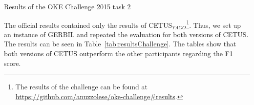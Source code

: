 \begin{table}[htb!]
\centering{}
\caption{Results of the OKE Challenge 2015 task 2}
\label{tab:resultsChallenge}
\centering
{}
\caption{Results for the different sub tasks of task 2}
\label{tab:resultsSubTasks}
\end{table}

The official results contained only the results of CETUS$_{YAGO}$\footnote{The results of the challenge can be found at \url{https://github.com/anuzzolese/oke-challenge\#results}.}.
Thus, we set up an instance of GERBIL and repeated the evaluation for both versions of CETUS.
The results can be seen in Table~\ref{tab:resultsChallenge}.
The tables show that both versions of CETUS outperform the other participants regarding the F1 score.

